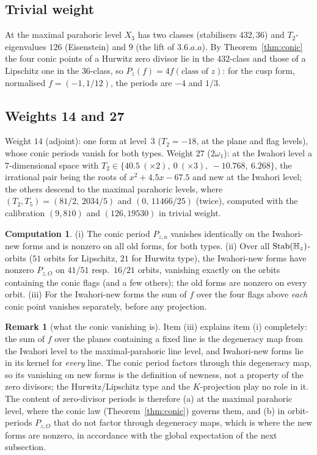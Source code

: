 \documentclass[11pt]{amsart}
\theoremstyle{definition}
\newtheorem{remark}[theorem]{Remark}
\newtheorem{computation}[theorem]{Computation}
\newcommand{\Stab}{\operatorname{Stab}}\newcommand{\Aut}{\operatorname{Aut}}\newcommand{\Der}{\operatorname{Der}}\renewcommand{\Im}{\operatorname{Im}}
\begin{document}
\subsection{Trivial weight}
At the maximal parahoric level $X_3$ has two classes (stabilisers $432,36$) and $T_2$-eigenvalues $126$ (Eisenstein) and $9$ (the lift of $3.6.a.a$). By Theorem~\ref{thm:conic} the four conic points of a Hurwitz zero divisor lie in the $432$-class and those of a Lipschitz one in the $36$-class, so $P_z(f)=4f(\text{class of }z)$: for the cusp form, normalised $f=(-1,1/12)$, the periods are $-4$ and $1/3$.

\subsection{Weights 14 and 27}
Weight $14$ (adjoint): one form at level~$3$ ($T_2=-18$, at the plane and flag levels), whose conic periods vanish for both types. Weight $27$ ($2\omega_1$): at the Iwahori level a $7$-dimensional space with $T_2\in\{40.5\ (\times 2),\ 0\ (\times 3),\ -10.768,\ 6.268\}$, the irrational pair being the roots of $x^2+4.5x-67.5$ and new at the Iwahori level; the others descend to the maximal parahoric levels, where $(T_2,T_5)=(81/2,\,2034/5)$ and $(0,\,11466/25)$ (twice), computed with the calibration $(9,810)$ and $(126,19530)$ in trivial weight.

\begin{computation}\label{comp:periods}
(i) The conic period $P_{z,u}$ vanishes identically on the Iwahori-new forms and is nonzero on all old forms, for both types. (ii) Over all $\Stab(\Hq_z)$-orbits ($51$ orbits for Lipschitz, $21$ for Hurwitz type), the Iwahori-new forms have nonzero $P_{z,O}$ on $41/51$ resp.\ $16/21$ orbits, vanishing exactly on the orbits containing the conic flags (and a few others); the old forms are nonzero on every orbit. (iii) For the Iwahori-new forms the sum of $f$ over the four flags above \emph{each} conic point vanishes separately, before any projection.
\end{computation}
\begin{remark}[what the conic vanishing is]
Item (iii) explains item (i) completely: the sum of $f$ over the planes containing a fixed line is the degeneracy map from the Iwahori level to the maximal-parahoric line level, and Iwahori-new forms lie in its kernel for \emph{every} line. The conic period factors through this degeneracy map, so its vanishing on new forms is the definition of newness, not a property of the zero divisors; the Hurwitz/Lipschitz type and the $K$-projection play no role in it. The content of zero-divisor periods is therefore (a) at the maximal parahoric level, where the conic law (Theorem~\ref{thm:conic}) governs them, and (b) in orbit-periods $P_{z,O}$ that do not factor through degeneracy maps, which is where the new forms are nonzero, in accordance with the global expectation of the next subsection.
\end{remark}
\end{document}
